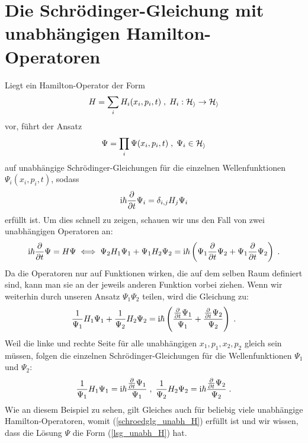 \section{Die Schrödinger-Gleichung mit unabhängigen Hamilton-Operatoren}
\label{kap:schroedglg_unabh_H}
  Liegt ein Hamilton-Operator der Form
  \begin{equation}
    H = \sum_i H_i(x_i,p_i,t) \;,\; H_i : \cal H_i \rightarrow H_i
    \label{unabh_H}
  \end{equation}
  vor, führt der Ansatz
  \begin{equation}
    \Psi = \prod_i \Psi(x_i,p_i,t) \; , \; \Psi_i \in \cal H_i
    \label{lsg_unabh_H}
  \end{equation}
  auf unabhängige Schrödinger-Gleichungen für die einzelnen Wellenfunktionen \\ $\Psi_i(x_i,p_i,t)$, sodass %
  \begin{equation}
    \text i \hbar \frac{\partial}{\partial t}\Psi_i = \delta_{i,j}  H_j \Psi_i
    \label{schroedglg_unabh_H}
  \end{equation}
  erfüllt ist.
  Um dies schnell zu zeigen, schauen wir uns den Fall von zwei unabhängigen Operatoren an:
  \begin{align}
    \begin{split}
      \text i \hbar \frac{\partial}{\partial t} \Psi = H\Psi \iff \Psi_2 H_1 \Psi_1 + \Psi_1 H_2 \Psi_2 = \text i \hbar \left(\Psi_1\frac{\partial}{\partial t} \Psi_2 + \Psi_1\frac{\partial}{\partial t} \Psi_2 \right) \; .
    \end{split}
  \end{align}
  Da die Operatoren nur auf Funktionen wirken, die auf dem selben Raum definiert sind, kann man sie an der jeweils anderen Funktion vorbei ziehen.
  Wenn wir weiterhin durch unseren Ansatz $\Psi_1\Psi_2$ teilen, wird die Gleichung zu:
  \begin{equation}
    \frac{1}{\Psi_1}H_1\Psi_1 + \frac{1}{\Psi_2}H_2\Psi_2 = \text i \hbar \left(\frac{\frac{\partial}{\partial t} \Psi_1}{\Psi_1} + \frac{\frac{\partial}{\partial t} \Psi_2}{\Psi_2} \right) \; .
  \end{equation}
  Weil die linke und rechte Seite für alle unabhängigen $x_1,p_1,x_2,p_2$ gleich sein müssen, folgen die einzelnen Schrödinger-Gleichungen für die Wellenfunktionen $\Psi_1$ und $\Psi_2$:
  \begin{equation}
    \frac{1}{\Psi_1}H_1\Psi_1 = \text i\hbar\frac{\frac{\partial}{\partial t} \Psi_1}{\Psi_1} \; , \; \frac{1}{\Psi_2}H_2\Psi_2 =\text i\hbar \frac{\frac{\partial}{\partial t} \Psi_2}{\Psi_2} \; .
  \end{equation}
  Wie an diesem Beispiel zu sehen, gilt Gleiches auch für beliebig viele unabhängige Hamilton-Operatoren, womit (\ref{schroedglg_unabh_H}) erfüllt ist und wir wissen, dass die Lösung $\Psi$ die Form (\ref{lsg_unabh_H}) hat.



